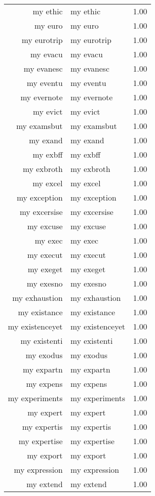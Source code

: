 \begin{table}[ht]
\begin{tabular}{rlr}
  my ethic & my ethic & 1.00 \\ 
  my euro & my euro & 1.00 \\ 
  my eurotrip & my eurotrip & 1.00 \\ 
  my evacu & my evacu & 1.00 \\ 
  my evanesc & my evanesc & 1.00 \\ 
  my eventu & my eventu & 1.00 \\ 
  my evernote & my evernote & 1.00 \\ 
  my evict & my evict & 1.00 \\ 
  my examsbut & my examsbut & 1.00 \\ 
  my exand & my exand & 1.00 \\ 
  my exbff & my exbff & 1.00 \\ 
  my exbroth & my exbroth & 1.00 \\ 
  my excel & my excel & 1.00 \\ 
  my exception & my exception & 1.00 \\ 
  my excersise & my excersise & 1.00 \\ 
  my excuse & my excuse & 1.00 \\ 
  my exec & my exec & 1.00 \\ 
  my execut & my execut & 1.00 \\ 
  my exeget & my exeget & 1.00 \\ 
  my exesno & my exesno & 1.00 \\ 
  my exhaustion & my exhaustion & 1.00 \\ 
  my existance & my existance & 1.00 \\ 
  my existenceyet & my existenceyet & 1.00 \\ 
  my existenti & my existenti & 1.00 \\ 
  my exodus & my exodus & 1.00 \\ 
  my expartn & my expartn & 1.00 \\ 
  my expens & my expens & 1.00 \\ 
  my experiments & my experiments & 1.00 \\ 
  my expert & my expert & 1.00 \\ 
  my expertis & my expertis & 1.00 \\ 
  my expertise & my expertise & 1.00 \\ 
  my export & my export & 1.00 \\ 
  my expression & my expression & 1.00 \\ 
  my extend & my extend & 1.00 \\ 

\end{tabular}
\end{table}
